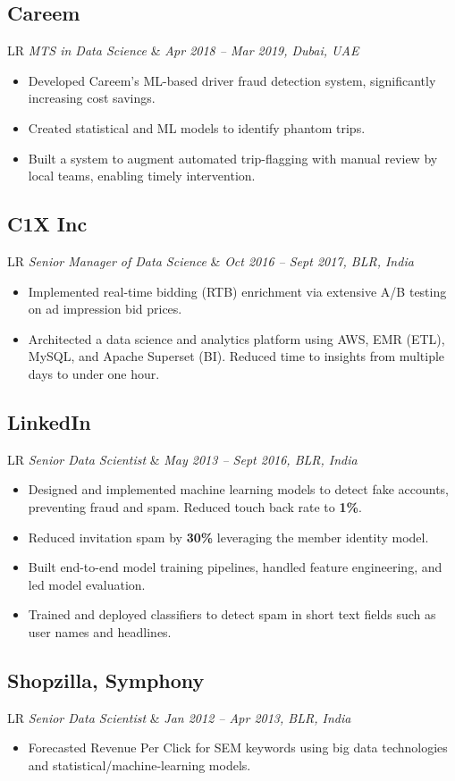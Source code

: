 \documentclass[11pt,a4paper]{moderncv}
\newcommand*{\experienceentry}[5][1mm]{
    \subsection{#2} \vspace{-1.5mm}
    \small{
    \begin{tabularx}{\textwidth}{LR}
        {\itshape #3} & {\itshape #4, #5}
    \end{tabularx}
    }
    \par\addvspace{#1}
}
\begin{document}
\begin{minipage}[t]{0.64\textwidth}
\experienceentry{Careem}{MTS in Data Science}{Apr 2018 -- Mar 2019}{Dubai, UAE}
\vspace{-5mm}
\begin{itemize}
    \item Developed Careem’s ML-based driver fraud detection system, significantly increasing cost savings.
    \item Created statistical and ML models to identify phantom trips.
    \item Built a system to augment automated trip-flagging with manual review by local teams, enabling timely intervention.
\end{itemize}
\vspace{0.5mm}

\experienceentry{C1X Inc}{Senior Manager of Data Science}{Oct 2016 -- Sept 2017}{BLR, India}
\vspace{-5mm}
\begin{itemize}
    \item Implemented real-time bidding (RTB) enrichment via extensive A/B testing on ad impression bid prices.
    \item Architected a data science and analytics platform using AWS, EMR (ETL), MySQL, and Apache Superset (BI). Reduced time to insights from multiple days to under one hour.
\end{itemize}
\vspace{0.5mm}

\experienceentry{LinkedIn}{Senior Data Scientist}{May 2013 -- Sept 2016}{BLR, India}
\vspace{-5mm}
\begin{itemize}
    \item Designed and implemented machine learning models to detect fake accounts, preventing fraud and spam. Reduced touch back rate to \textbf{1\%}.
    \item Reduced invitation spam by \textbf{30\%} leveraging the member identity model.
    \item Built end-to-end model training pipelines, handled feature engineering, and led model evaluation.
    \item Trained and deployed classifiers to detect spam in short text fields such as user names and headlines.
\end{itemize}

\experienceentry{Shopzilla, Symphony}{Senior Data Scientist}{Jan 2012 -- Apr 2013}{BLR, India}
\vspace{-5mm}
\begin{itemize}
    \item Forecasted Revenue Per Click for SEM keywords using big data technologies and statistical/machine-learning models.
\end{itemize}


\end{minipage}
\end{document}
